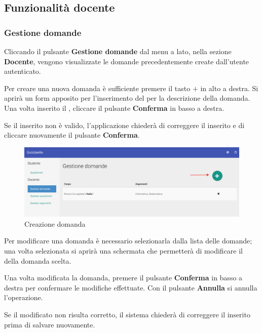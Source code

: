 \documentclass[12pt,a4paper]{article}
\begin{document}
	\subsection{Funzionalità docente}
	
    \subsubsection{Gestione domande}

    Cliccando il pulsante \textbf{Gestione domande} dal menu a lato, nella sezione \textbf{Docente}, vengono visualizzate le domande precedentemente create dall'utente autenticato. 
    
	Per creare una nuova domanda è sufficiente premere il tasto $\boldsymbol{+}$ in alto a destra. Si aprirà un form apposito per l'inserimento del  per la descrizione della domanda. Una volta inserito il , cliccare il pulsante \textbf{Conferma} in basso a destra.
	
	Se il  inserito non è valido, l'applicazione chiederà di correggere il  inserito e di cliccare nuovamente il pulsante \textbf{Conferma}.
	
		\begin{figure}[H]	
			\centering
			\includegraphics[width=1\linewidth]{../img/screenshot/creazioneDomanda.png}
			\caption{Creazione domanda}
			\label{Creazione domanda}
		\end{figure}
	
	\par Per modificare una domanda è necessario selezionarla dalla lista delle domande; una volta selezionata si aprirà una schermata che permetterà di modificare il  della domanda scelta. \\
	\par Una volta modificata la domanda, premere il pulsante \textbf{Conferma} in basso a destra per confermare le modifiche effettuate. Con il pulsante \textbf{Annulla} si annulla l'operazione. \\
	\par Se il  modificato non risulta corretto, il sistema chiederà di correggere il  inserito prima di salvare nuovamente. \\
	
\end{document}

